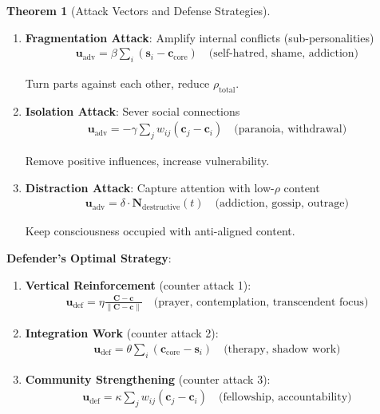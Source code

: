 \documentclass[11pt,a4paper]{article}
\theoremstyle{definition}
\newtheorem{theorem}{Theorem}[section]
\theoremstyle{remark}
\newcommand{\cc}{\mathbf{c}}
\begin{document}
\begin{enumerate}
\begin{theorem}[Attack Vectors and Defense Strategies]
\begin{enumerate}
    \item \textbf{Fragmentation Attack}: Amplify internal conflicts (sub-personalities)
        \begin{align}
        \mathbf{u}_{\text{adv}} = \beta \sum_i (\mathbf{s}_i - \cc_{\text{core}}) \quad \text{(self-hatred, shame, addiction)}
        \end{align}
        
        Turn parts against each other, reduce \(\rho_{\text{total}}\).
    
    \item \textbf{Isolation Attack}: Sever social connections
        \begin{align}
        \mathbf{u}_{\text{adv}} = -\gamma \sum_j w_{ij}(\cc_j - \cc_i) \quad \text{(paranoia, withdrawal)}
        \end{align}
        
        Remove positive influences, increase vulnerability.
    
    \item \textbf{Distraction Attack}: Capture attention with low-\(\rho\) content
        \begin{align}
        \mathbf{u}_{\text{adv}} = \delta \cdot \mathbf{N}_{\text{destructive}}(t) \quad \text{(addiction, gossip, outrage)}
        \end{align}
        
        Keep consciousness occupied with anti-aligned content.
\end{enumerate}

\textbf{Defender's Optimal Strategy}:

\begin{enumerate}
    \item \textbf{Vertical Reinforcement} (counter attack 1):
        \begin{align}
        \mathbf{u}_{\text{def}} = \eta \frac{\mathbf{C} - \cc}{\|\mathbf{C} - \cc\|} \quad \text{(prayer, contemplation, transcendent focus)}
        \end{align}
    
    \item \textbf{Integration Work} (counter attack 2):
        \begin{align}
        \mathbf{u}_{\text{def}} = \theta \sum_i (\cc_{\text{core}} - \mathbf{s}_i) \quad \text{(therapy, shadow work)}
        \end{align}
    
    \item \textbf{Community Strengthening} (counter attack 3):
        \begin{align}
        \mathbf{u}_{\text{def}} = \kappa \sum_j w_{ij}(\cc_j - \cc_i) \quad \text{(fellowship, accountability)}
        \end{align}
    

\end{enumerate}
\end{theorem}
\end{enumerate}
\end{document}
